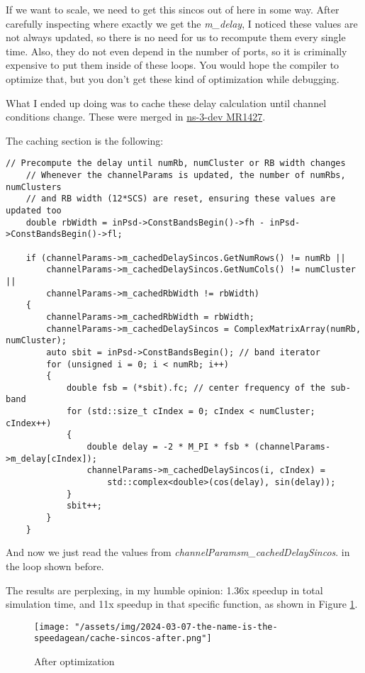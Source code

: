 \documentclass{article}
\begin{document}
If we want to scale, we need to get this sincos out of here in some way.
After carefully inspecting where exactly we get the \emph{m\_delay}, I noticed
these values are not always updated, so there is no need for us to recompute
them every single time. Also, they do not even depend in the number of ports,
so it is criminally expensive to put them inside of these loops. You would
hope the compiler to optimize that, but you don't get these kind of
optimization while debugging.

What I ended up doing was to cache these delay calculation until channel
conditions change. These were merged in
\href{https://gitlab.com/nsnam/ns-3-dev/-/merge_requests/1427}{ns-3-dev MR1427}.

The caching section is the following:

\begin{lstlisting}
// Precompute the delay until numRb, numCluster or RB width changes
    // Whenever the channelParams is updated, the number of numRbs, numClusters
    // and RB width (12*SCS) are reset, ensuring these values are updated too
    double rbWidth = inPsd->ConstBandsBegin()->fh - inPsd->ConstBandsBegin()->fl;

    if (channelParams->m_cachedDelaySincos.GetNumRows() != numRb ||
        channelParams->m_cachedDelaySincos.GetNumCols() != numCluster ||
        channelParams->m_cachedRbWidth != rbWidth)
    {
        channelParams->m_cachedRbWidth = rbWidth;
        channelParams->m_cachedDelaySincos = ComplexMatrixArray(numRb, numCluster);
        auto sbit = inPsd->ConstBandsBegin(); // band iterator
        for (unsigned i = 0; i < numRb; i++)
        {
            double fsb = (*sbit).fc; // center frequency of the sub-band
            for (std::size_t cIndex = 0; cIndex < numCluster; cIndex++)
            {
                double delay = -2 * M_PI * fsb * (channelParams->m_delay[cIndex]);
                channelParams->m_cachedDelaySincos(i, cIndex) =
                    std::complex<double>(cos(delay), sin(delay));
            }
            sbit++;
        }
    }
\end{lstlisting}

And now we just read the values from \emph{channelParams\rightarrow m\_cachedDelaySincos}.
in the loop shown before.

The results are perplexing, in my humble opinion: 1.36x speedup in total simulation time,
and 11x speedup in that specific function, as shown in Figure \ref{fig:cache-sincos-after}.
\begin{figure}
    \texttt{[image: "/assets/img/2024-03-07-the-name-is-the-speedagean/cache-sincos-after.png"]}
    \caption{After optimization}
    \label{fig:cache-sincos-after}
\end{figure}
\end{document}
